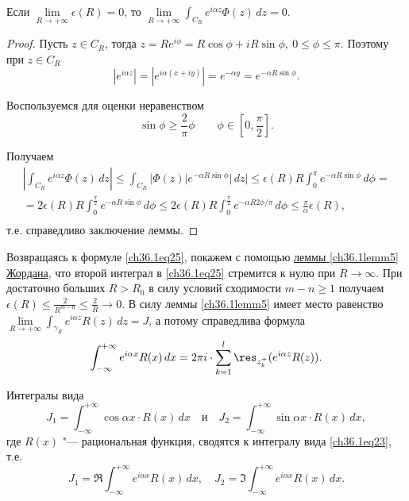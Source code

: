 \begin{leftbar}
\begin{lemm} [Жордана]
Если $\lim\limits_{R \to +\infty} \epsilon(R) = 0$, то $\lim\limits_{R \to +\infty} \int_{C_R} e^{i \alpha z} \Phi(z) \,dz = 0$.
\end{lemm}

\begin{proof}
Пусть $z \in C_R$, тогда $z = Re^{i\phi} = R\cos\phi + iR\sin\phi, \: 0 \le \phi \le \pi$. Поэтому при $z \in C_R$
$$
|e^{i \alpha z}| = |e^{i \alpha(x + iy)}| = e^{-\alpha y} = e^{- \alpha R \sin\phi}.
$$

Воспользуемся для оценки неравенством
\begin{equation} \label{ch36.1eq26}
\sin \phi \ge \frac{2}{\pi}\phi \quad \text{} \quad \phi \in \left[ 0, \frac{\pi}{2}\right].
\end{equation}

Получаем
\begin{multline*}
\left| \int_{C_R} e^{i \alpha z} \Phi(z)\,dz \right| \le \int_{C_R} |\Phi(z)|e^{-\alpha R \sin \phi}|\,dz| \le \epsilon(R)R \int_0^\pi e^{-\alpha R \sin\phi} \,d\phi =\\= 2\epsilon(R)R \int_0^{\frac{\pi}{2}} e^{-\alpha R \sin\phi} \,d\phi \le 2\epsilon(R)R \int_0^{\frac{\pi}{2}} e^{-\alpha R 2\phi / \pi} \,d\phi \le \frac{\pi}{\alpha} \epsilon(R),\\
\end{multline*}
т.е. справедливо заключение леммы.
\end{proof}

Возвращаясь к формуле \eqref{ch36.1eq25}, покажем с помощью \hyperref[ch36.1lemm5]{леммы \ref{ch36.1lemm5} Жордана}, что второй интеграл в \eqref{ch36.1eq25} стремится к нулю при $R \to \infty$. При достаточно больших $R > R_0$ в силу условий сходимости $m - n \ge 1$ получаем $\epsilon(R) \le \frac{2}{R^{m - n}} \le \frac{2}{R} \to 0$. В силу леммы  \ref{ch36.1lemm5} имеет место равенство $\lim\limits_{R \to +\infty} \int_{\gamma_R} e^{i \alpha z}R(z) \,dz = J$, а потому справедлива формула
\begin{equation} \label{ch36.1eq27}
\int_{-\infty}^{+\infty} e^{i \alpha x}R(x) \,dx = 2\pi i \cdot \sum_{k = 1}^l \res_{z_k^+} (e^{i \alpha z}R(z)).
\end{equation}

\begin{cons} \label{ch36.1cons2}
Интегралы вида
\begin{equation} \label{ch36.1eq28}
J_1 = \int_{-\infty}^{+\infty} \cos\alpha x \cdot R(x) \,dx \quad \text{и} \quad J_2 = \int_{-\infty}^{+\infty} \sin \alpha x \cdot R(x) \,dx,
\end{equation}
где $R(x)$ "--- рациональная функция, сводятся к интегралу вида \eqref{ch36.1eq23}, т.е.
$$
J_1 = \Re \int_{-\infty}^{+\infty} e^{i \alpha x} R(x) \,dx, \quad J_2 = \Im \int_{-\infty}^{+\infty} e^{i \alpha x}R(x) \,dx.
$$
\end{cons}
\end{leftbar}